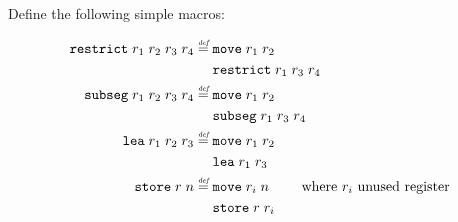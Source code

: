 \documentclass[a4paper]{article}
\newcommand{\defeq}{\stackrel{\textit{\tiny{def}}}{=}}
\newcommand{\zinstr}[1]{\mathtt{#1}}
\newcommand{\twoinstr}[3]{\zinstr{#1} \; #2 \; #3}
\newcommand{\move}[2]{\twoinstr{move}{#1}{#2}}
\newcommand{\store}[2]{\twoinstr{store}{#1}{#2}}
\newcommand{\lea}[2]{\twoinstr{lea}{#1}{#2}}
\newcommand{\threeinstr}[4]{\zinstr{#1} \; #2 \; #3 \; #4}
\newcommand{\restrict}[3]{\threeinstr{restrict}{#1}{#2}{#3}}
\newcommand{\subseg}[3]{\threeinstr{subseg}{#1}{#2}{#3}}
\begin{document}
Define the following simple macros:

\begin{align*}
  \restrict{r_1}{r_2}{r_3} \; r_4 &\defeq
                                    \begin{aligned}[t]
                                      & \move{r_1}{r_2} \\
                                      & \restrict{r_1}{r_3}{r_4}
                                    \end{aligned} \\
  \subseg{r_1}{r_2}{r_3} \; r_4   &\defeq
                                    \begin{aligned}[t]
                                      & \move{r_1}{r_2} \\
                                      & \subseg{r_1}{r_3}{r_4}
                                    \end{aligned}\\
  \lea{r_1}{r_2} \; r_3           &\defeq
                                    \begin{aligned}[t]
                                      & \move{r_1}{r_2} \\
                                      & \lea{r_1}{r_3}
                                    \end{aligned}\\
  \store{r}{n} &\defeq
                   \begin{aligned}[t]
                     & \move{r_i}{n} \qquad \text{ where $r_i$ unused register}\\
                     & \store{r}{r_i}
                   \end{aligned}
\end{align*}
\end{document}
